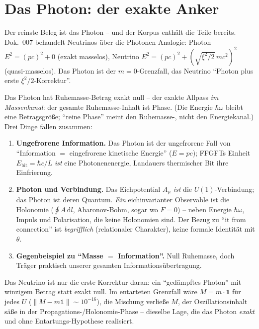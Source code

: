 \section{Das Photon: der exakte Anker}
Der reinste Beleg ist das Photon -- und der Korpus enthält die Teile bereits. Dok.~007 behandelt
Neutrinos über die Photonen-Analogie: Photon $E^2=(pc)^2+0$ (exakt masselos), Neutrino
$E^2=(pc)^2+(\sqrt{\xi^2/2}\,mc^2)^2$ (quasi-masselos). Das Photon ist der $m=0$-Grenzfall, das Neutrino
\enquote{Photon plus erste $\xi^2/2$-Korrektur}.

Das Photon hat Ruhemasse-Betrag exakt null -- der exakte Allpass \emph{im Massenkanal}: der gesamte Ruhemasse-Inhalt ist Phase. (Die Energie $\hbar\omega$ bleibt eine Betragsgröße; \enquote{reine Phase} meint den Ruhemasse-, nicht den Energiekanal.) Drei Dinge
fallen zusammen:
\begin{enumerate}
  \item \textbf{Ungefrorene Information.} Das Photon ist der ungefrorene Fall von
        \enquote{Information $=$ eingefrorene kinetische Energie} ($E=pc$); FFGFTs Einheit
        $E_\text{bit}=\hbar c/L$ \emph{ist} eine Photonenenergie, Landauers thermischer Bit ihre
        Einfrierung.
  \item \textbf{Photon und Verbindung.} Das Eichpotential $A_\mu$ \emph{ist} die $U(1)$-Verbindung; das
        Photon ist deren Quantum. \emph{Ein} eichinvarianter Observable ist die Holonomie
        ($\oint A\,\mathrm{d}l$, Aharonov-Bohm, sogar wo $F=0$) -- neben Energie $\hbar\omega$, Impuls und
        Polarisation, die keine Holonomien sind. Der Bezug zu \enquote{it from connection} ist
        \emph{begrifflich} (relationaler Charakter), keine formale Identität mit $\theta$.
  \item \textbf{Gegenbeispiel zu \enquote{Masse $=$ Information}.} Null Ruhemasse, doch Träger praktisch
        unserer gesamten Informationsübertragung.
\end{enumerate}

Das Neutrino ist nur die erste Korrektur daran: ein \enquote{gedämpftes Photon} mit winzigem Betrag statt
exakt null. Im entarteten Grenzfall wäre $M=m\cdot\mathbb{1}$ für jedes $U$
($\lVert M-m\mathbb{1}\rVert\sim10^{-16}$), die Mischung verließe $M$, der Oszillationsinhalt säße in der
Propagations-/Holonomie-Phase -- dieselbe Lage, die das Photon \emph{exakt} und ohne
Entartungs-Hypothese realisiert.

